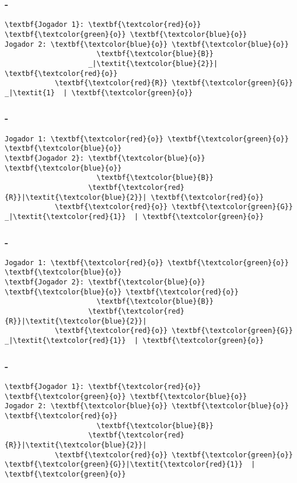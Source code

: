 \begin{frame}[fragile]
\frametitle{\secname - \subsecname}
\begin{Verbatim}[commandchars=\\\{\}]
\textbf{Jogador 1}: \textbf{\textcolor{red}{o}} \textbf{\textcolor{green}{o}} \textbf{\textcolor{blue}{o}}
Jogador 2: \textbf{\textcolor{blue}{o}} \textbf{\textcolor{blue}{o}}
                      \textbf{\textcolor{blue}{B}}
                    _|\textit{\textcolor{blue}{2}}| \textbf{\textcolor{red}{o}}
            \textbf{\textcolor{red}{R}} \textbf{\textcolor{green}{G}}   _|\textit{1}  | \textbf{\textcolor{green}{o}}
\end{Verbatim}
\end{frame}

\begin{frame}[fragile]
\frametitle{\secname - \subsecname}
\begin{Verbatim}[commandchars=\\\{\}]
Jogador 1: \textbf{\textcolor{red}{o}} \textbf{\textcolor{green}{o}} \textbf{\textcolor{blue}{o}}
\textbf{Jogador 2}: \textbf{\textcolor{blue}{o}} \textbf{\textcolor{blue}{o}}
                      \textbf{\textcolor{blue}{B}}
                    \textbf{\textcolor{red}{R}}|\textit{\textcolor{blue}{2}}| \textbf{\textcolor{red}{o}}
            \textbf{\textcolor{red}{o}} \textbf{\textcolor{green}{G}}   _|\textit{\textcolor{red}{1}}  | \textbf{\textcolor{green}{o}}
\end{Verbatim}
\end{frame}

\begin{frame}[fragile]
\frametitle{\secname - \subsecname}
\begin{Verbatim}[commandchars=\\\{\}]
Jogador 1: \textbf{\textcolor{red}{o}} \textbf{\textcolor{green}{o}} \textbf{\textcolor{blue}{o}}
\textbf{Jogador 2}: \textbf{\textcolor{blue}{o}} \textbf{\textcolor{blue}{o}} \textbf{\textcolor{red}{o}}
                      \textbf{\textcolor{blue}{B}}
                    \textbf{\textcolor{red}{R}}|\textit{\textcolor{blue}{2}}|
            \textbf{\textcolor{red}{o}} \textbf{\textcolor{green}{G}}   _|\textit{\textcolor{red}{1}}  | \textbf{\textcolor{green}{o}}
\end{Verbatim}
\end{frame}

\begin{frame}[fragile]
\frametitle{\secname - \subsecname}
\begin{Verbatim}[commandchars=\\\{\}]
\textbf{Jogador 1}: \textbf{\textcolor{red}{o}} \textbf{\textcolor{green}{o}} \textbf{\textcolor{blue}{o}}
Jogador 2: \textbf{\textcolor{blue}{o}} \textbf{\textcolor{blue}{o}} \textbf{\textcolor{red}{o}}
                      \textbf{\textcolor{blue}{B}}
                    \textbf{\textcolor{red}{R}}|\textit{\textcolor{blue}{2}}|
            \textbf{\textcolor{red}{o}} \textbf{\textcolor{green}{o}}   \textbf{\textcolor{green}{G}}|\textit{\textcolor{red}{1}}  | \textbf{\textcolor{green}{o}}
\end{Verbatim}
\end{frame}

